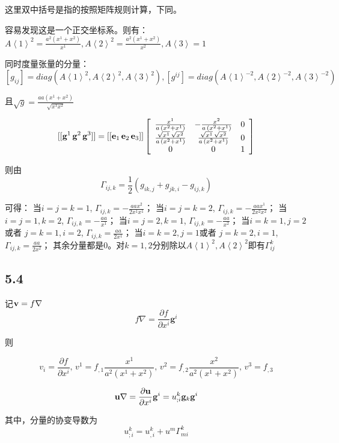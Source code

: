 \documentclass[UTF8,zihao=5]{ctexart}
\newcommand{\bm}[1]{{\mathbf{#1}}}
\newcommand*{\av}[1]{\left\langle{#1}\right\rangle}
\newcommand*{\pd}[2]{\frac{\partial #1}{\partial #2}}
\begin{document}
这里双中括号是指的按照矩阵规则计算，下同。

容易发现这是一个正交坐标系。则有：
$A\av{1}^2 = \frac{a^2(x^1+x^2)}{x^1}, A\av{2}^2 = \frac{a^2(x^1+x^2)}{x^2}, A\av{3} =1$

同时度量张量的分量：$[g_{ij}]=diag(A\av{1}^2,A\av{2}^2,A\av{3}^2),[g^{ij}]=diag(A\av{1}^{-2},A\av{2}^{-2},A\av{3}^{-2})$

且$\sqrt{g}=\frac{aa(x^1+x^2)}{\sqrt{x^1x^2}}$

$$
    [[\g^1\,\g^2\,\g^3]]=
    [[\bm{e}_1\,\bm{e}_2\,\bm{e}_3]]
    \left[\begin{array}{ccc} \frac{x^{1}}{a\,\left(x^{2}+x^{1}\right)} & -\frac{x^{2}}{a\,\left(x^{2}+x^{1}\right)} & 0\\ \frac{\sqrt{x^{1}}\,\sqrt{x^{2}}}{a\,\left(x^{2}+x^{1}\right)} & \frac{\sqrt{x^{1}}\,\sqrt{x^{2}}}{a\,\left(x^{2}+x^{1}\right)} & 0\\ 0 & 0 & 1 \end{array}\right]
$$

则由
$$
    \Gamma_{ij,k}=
    \frac{1}{2}
    (g_{ik,j} + g_{jk,i} - g_{ij,k})
$$

可得：
当$i=j=k=1$, $\Gamma_{ij,k}=-\frac{aax^2}{2x^1x^1}$；
当$i=j=k=2$, $\Gamma_{ij,k}=-\frac{aax^1}{2x^2x^2}$；
当$i=j=1, k=2$, $\Gamma_{ij,k}=-\frac{aa}{x^1}$；
当$i=j=2, k=1$, $\Gamma_{ij,k}=-\frac{aa}{x^2}$；
当$i=k=1, j=2$或者 $j=k=1, i=2$, $\Gamma_{ij,k}=\frac{aa}{2x^1}$；
当$i=k=2, j=1$或者 $j=k=2, i=1$, $\Gamma_{ij,k}=\frac{aa}{2x^2}$；
其余分量都是0。对$k=1,2$分别除以$A\av{1}^2,A\av{2}^2$即有$\Gamma^k_{ij}$

\subsection*{5.4}

记$\vv=f\nabla$
$$
    f\nabla=\pd{f}{x^i}\bm{g}^i
$$

则

\begin{equation}
    v_i=\pd{f}{x^i},\, v^1=f_{,1}\frac{x^1}{a^2(x^1+x^2)},\, v^2=f_{,2}\frac{x^2}{a^2(x^1+x^2)},\, v^3=f_{,3}
    \label{eq:gradf}
\end{equation}

$$
    \uu\nabla=\pd{\uu}{x^i}\bm{g}^i=u^k_{;i}\g_k\g^i
$$

其中，分量的协变导数为
$$
    u^k_{;i}=u^k_{,i} + u^m\Gamma^k_{mi}
$$
\end{document}
